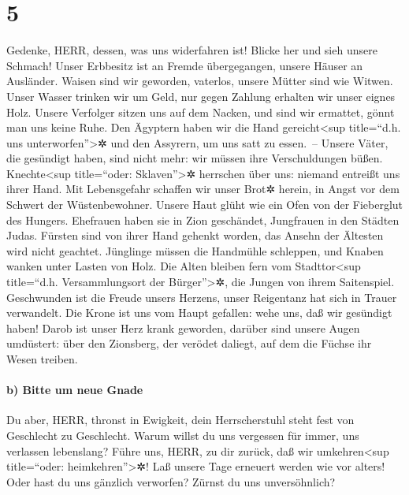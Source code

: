 \hypertarget{section-4}{%
\section{5}\label{section-4}}

Gedenke, HERR, dessen, was uns widerfahren ist! Blicke her
und sieh unsere Schmach! Unser Erbbesitz ist an Fremde
übergegangen, unsere Häuser an Ausländer. Waisen sind wir
geworden, vaterlos, unsere Mütter sind wie Witwen. Unser
Wasser trinken wir um Geld, nur gegen Zahlung erhalten wir unser eignes
Holz. Unsere Verfolger sitzen uns auf dem Nacken, und sind
wir ermattet, gönnt man uns keine Ruhe. Den Ägyptern haben
wir die Hand gereicht\textless sup title=``d.h. uns
unterworfen''\textgreater✲ und den Assyrern, um uns satt zu essen.~--
Unsere Väter, die gesündigt haben, sind nicht mehr: wir
müssen ihre Verschuldungen büßen. Knechte\textless sup
title=``oder: Sklaven''\textgreater✲ herrschen über uns: niemand
entreißt uns ihrer Hand. Mit Lebensgefahr schaffen wir
unser Brot✲ herein, in Angst vor dem Schwert der Wüstenbewohner.
Unsere Haut glüht wie ein Ofen von der Fieberglut des
Hungers. Ehefrauen haben sie in Zion geschändet,
Jungfrauen in den Städten Judas. Fürsten sind von ihrer
Hand gehenkt worden, das Ansehn der Ältesten wird nicht geachtet.
Jünglinge müssen die Handmühle schleppen, und Knaben
wanken unter Lasten von Holz. Die Alten bleiben fern vom
Stadttor\textless sup title=``d.h. Versammlungsort der
Bürger''\textgreater✲, die Jungen von ihrem Saitenspiel.
Geschwunden ist die Freude unsers Herzens, unser
Reigentanz hat sich in Trauer verwandelt. Die Krone ist
uns vom Haupt gefallen: wehe uns, daß wir gesündigt haben!
Darob ist unser Herz krank geworden, darüber sind unsere
Augen umdüstert: über den Zionsberg, der verödet daliegt,
auf dem die Füchse ihr Wesen treiben.

\hypertarget{b-bitte-um-neue-gnade}{%
\paragraph{b) Bitte um neue Gnade}\label{b-bitte-um-neue-gnade}}

Du aber, HERR, thronst in Ewigkeit, dein Herrscherstuhl
steht fest von Geschlecht zu Geschlecht. Warum willst du
uns vergessen für immer, uns verlassen lebenslang? Führe
uns, HERR, zu dir zurück, daß wir umkehren\textless sup title=``oder:
heimkehren''\textgreater✲! Laß unsere Tage erneuert werden wie vor
alters! Oder hast du uns gänzlich verworfen? Zürnst du
uns unversöhnlich?
